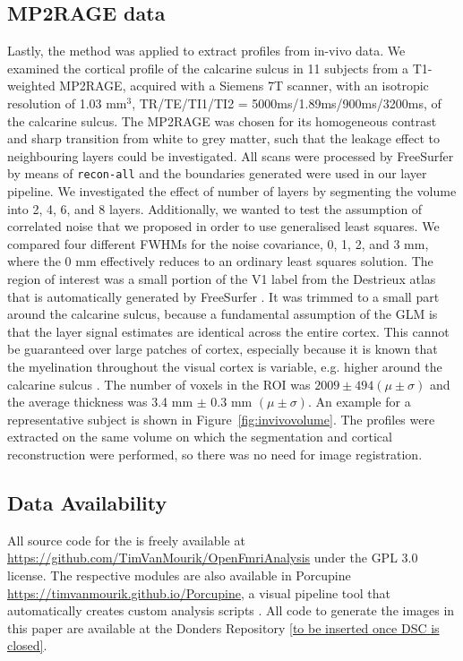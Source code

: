 \subsection{MP2RAGE data}
Lastly, the method was applied to extract profiles from in-vivo data. We examined the cortical profile of the calcarine sulcus in 11 subjects from a T1-weighted MP2RAGE, acquired with a Siemens 7T scanner, with an isotropic resolution of 1.03 mm$^3$, TR/TE/TI1/TI2 = 5000ms/1.89ms/900ms/3200ms, of the calcarine sulcus. The MP2RAGE was chosen for its homogeneous contrast and sharp transition from white to grey matter, such that the leakage effect to neighbouring layers could be investigated. All scans were processed by FreeSurfer \cite{Dale1999} by means of \texttt{recon-all} and the boundaries generated were used in our layer pipeline. We investigated the effect of number of layers by segmenting the volume into 2, 4, 6, and 8 layers. Additionally, we wanted to test the assumption of correlated noise that we proposed in order to use generalised least squares. We compared four different FWHMs for the noise covariance, 0, 1, 2, and 3 mm, where the 0 mm effectively reduces to an ordinary least squares solution. The region of interest was a small portion of the V1 label from the Destrieux atlas that is automatically generated by FreeSurfer \cite{Fischl2004}. It was trimmed to a small part around the calcarine sulcus, because a fundamental assumption of the GLM is that the layer signal estimates are identical across the entire cortex. This cannot be guaranteed over large patches of cortex, especially because it is known that the myelination throughout the visual cortex is variable, e.g. higher around the calcarine sulcus \cite{Bridge2005}. The number of voxels in the ROI was $2009 \pm 494 (\mu \pm \sigma)$ and the average thickness was 3.4 mm $\pm$ 0.3 mm $(\mu \pm \sigma)$. An example for a representative subject is shown in Figure~\ref{fig:invivovolume}. The profiles were extracted on the same volume on which the segmentation and cortical reconstruction were performed, so there was no need for image registration.


\subsection*{Data Availability}
All source code for the  is freely available at \url{https://github.com/TimVanMourik/OpenFmriAnalysis} under the GPL 3.0 license. The respective modules are also available in Porcupine \url{https://timvanmourik.github.io/Porcupine}, a visual pipeline tool that automatically creates custom analysis scripts \cite{VanMourik2017}. All code to generate the images in this paper are available at the Donders Repository \url{[to be inserted once DSC is closed]}.

